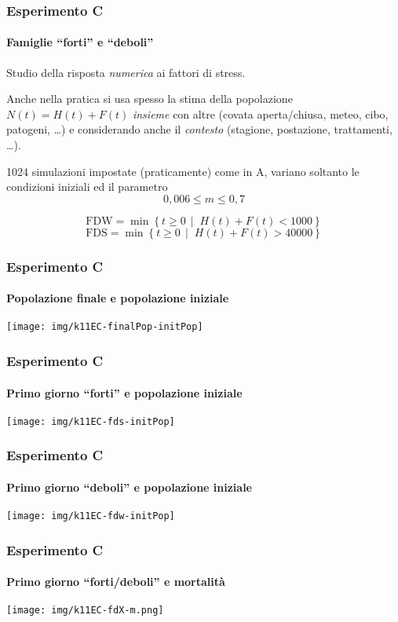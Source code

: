 \documentclass[]{beamer}
\newcommand{\st}{\,\mid\;}
\begin{document}
\begin{frame}
    \frametitle{Esperimento C}
    \framesubtitle{Famiglie ``forti'' e ``deboli''}

    Studio della risposta \emph{numerica} ai fattori di stress.

    Anche nella pratica si usa spesso la stima della popolazione $N(t)=H(t)+F(t)$
    \pause
    \emph{insieme} con altre (covata aperta/chiusa, meteo, cibo, patogeni, \dots)
    \pause
    e considerando anche il \emph{contesto} (stagione, postazione, trattamenti, \dots).

    \pause
    \vspace{0.5em}
    1024 simulazioni impostate (praticamente) come in A,
    variano soltanto le condizioni iniziali ed il parametro
    $$ 0,006 \leq m \leq 0,7$$

    \pause
    $$\text{FDW} = \min \left\{ t \geq 0 \st H(t) + F(t) < 1000 \right\} $$
    \pause
    $$\text{FDS} = \min \left\{ t \geq 0 \st H(t) + F(t) > 40000 \right\} $$
\end{frame}

\begin{frame}
    \frametitle{Esperimento C}
    \framesubtitle{Popolazione finale e popolazione iniziale}

    \begin{center}
        \texttt{[image: img/k11EC-finalPop-initPop]}
    \end{center}
\end{frame}

\begin{frame}
    \frametitle{Esperimento C}
    \framesubtitle{Primo giorno ``forti'' e popolazione iniziale}

    \begin{center}
        \texttt{[image: img/k11EC-fds-initPop]}
    \end{center}
\end{frame}

\begin{frame}
    \frametitle{Esperimento C}
    \framesubtitle{Primo giorno ``deboli'' e popolazione iniziale}

    \begin{center}
        \texttt{[image: img/k11EC-fdw-initPop]}
    \end{center}
\end{frame}

\begin{frame}
    \frametitle{Esperimento C}
    \framesubtitle{Primo giorno ``forti/deboli'' e mortalità}

    \begin{center}
        \texttt{[image: img/k11EC-fdX-m.png]}
    \end{center}
\end{frame}
\end{document}
